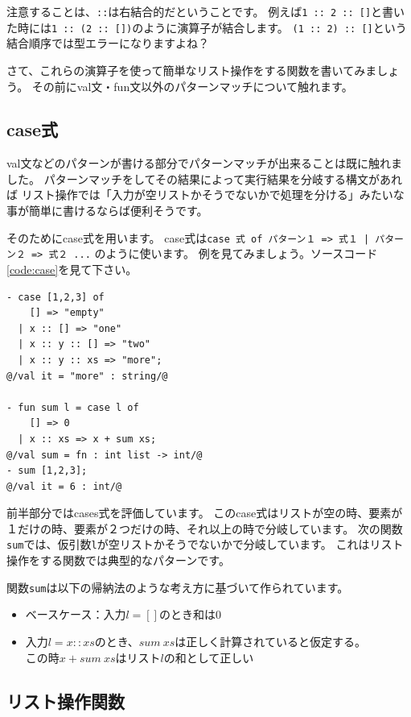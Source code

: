 \documentclass[11pt,a4paper]{article}
\begin{document}
注意することは、\lstinline{::}は右結合的だということです。
例えば\lstinline{1 :: 2 :: []}と書いた時には\lstinline{1 :: (2 :: [])}のように演算子が結合します。
\lstinline{(1 :: 2) :: []}という結合順序では型エラーになりますよね？

さて、これらの演算子を使って簡単なリスト操作をする関数を書いてみましょう。
その前にval文・fun文以外のパターンマッチについて触れます。

\subsection{case式}

val文などのパターンが書ける部分でパターンマッチが出来ることは既に触れました。
パターンマッチをしてその結果によって実行結果を分岐する構文があれば
リスト操作では「入力が空リストかそうでないかで処理を分ける」みたいな事が簡単に書けるならば便利そうです。

そのためにcase式を用います。
case式は\lstinline{case 式 of パターン１ => 式１ | パターン２ => 式２ ...}
のように使います。
例を見てみましょう。ソースコード\ref{code:case}を見て下さい。

\begin{lstlisting}[caption=case式,label=code:case]
- case [1,2,3] of
    [] => "empty"
  | x :: [] => "one"
  | x :: y :: [] => "two"
  | x :: y :: xs => "more";
@/val it = "more" : string/@

- fun sum l = case l of
    [] => 0
  | x :: xs => x + sum xs;
@/val sum = fn : int list -> int/@
- sum [1,2,3];
@/val it = 6 : int/@
\end{lstlisting}

前半部分ではcases式を評価しています。
このcase式はリストが空の時、要素が１だけの時、要素が２つだけの時、それ以上の時で分岐しています。
次の関数\lstinline{sum}では、仮引数\lstinline{l}が空リストかそうでないかで分岐しています。
これはリスト操作をする関数では典型的なパターンです。

関数\lstinline{sum}は以下の帰納法のような考え方に基づいて作られています。
\begin{itemize}
\item ベースケース：入力$l = []$のとき和は0
\item 入力$l = x :: xs$のとき、$sum \ xs$は正しく計算されていると仮定する。\\
  この時$x + sum \ xs$はリスト$l$の和として正しい
\end{itemize}

\subsection{リスト操作関数}
\end{document}
